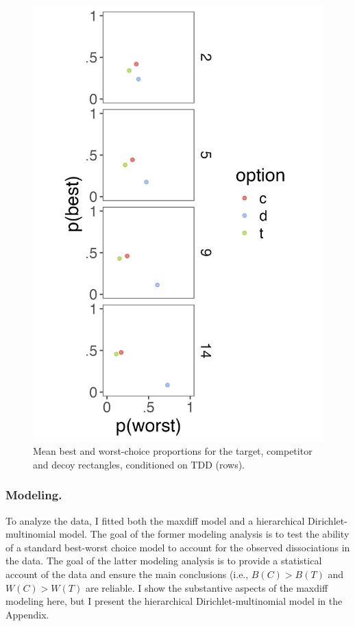 \begin{figure}
   \includegraphics[width=\linewidth]{figures/crit_mean_props_by_dist.jpeg}
   \caption{Mean best and worst-choice proportions for the target, competitor and decoy rectangles, conditioned on TDD (rows).}
   \label{fig:bw_mean_choice_collapsed}
\end{figure}


\subsubsection{Modeling.}

To analyze the data, I fitted both the maxdiff model and a hierarchical Dirichlet-multinomial model. The goal of the former modeling analysis is to test the ability of a standard best-worst choice model to account for the observed dissociations in the data. The goal of the latter modeling analysis is to provide a statistical account of the data and ensure the main conclusions (i.e., $B(C)>B(T)$ and $W(C)>W(T)$ are reliable. I show the substantive aspects of the maxdiff modeling here, but I present the hierarchical Dirichlet-multinomial model in the Appendix.


